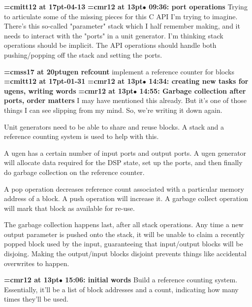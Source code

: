 {\medskip\noindent\bf\font\titlefont=cmitt12 at 17pt-04-13}\medskip
{\smallskip\noindent\bf\font\titlefont=cmr12 at 13pt\titlefont $\bullet$ 09:36: port operations}\smallskip
Trying to articulate some of the missing pieces for this C API I'm trying to imagine. There's this so-called "parameter" stack which I half remember making, and it needs to interact with the "ports" in a unit generator. I'm thinking stack operations should be implicit. The API operations should handle both pushing/popping off the stack and setting the ports.
\par

{\medskip\noindent\bf\font\titlefont=cmss17 at 20pt\titlefont ugen refcount}\medskip
implement a reference counter for blocks
{\medskip\noindent\bf\font\titlefont=cmitt12 at 17pt-01-31}\medskip
{\smallskip\noindent\bf\font\titlefont=cmr12 at 13pt\titlefont $\bullet$ 14:34: creating new tasks for ugens, writing words}\smallskip
{\smallskip\noindent\bf\font\titlefont=cmr12 at 13pt\titlefont $\bullet$ 14:55: Garbage collection after ports, order matters}\smallskip
I may have mentioned this already. But it's one of those things I can see slipping from my mind. So, we're writing it down again.
\par

Unit generators need to be able to share and reuse blocks. A stack and a reference counting system is used to help with this.
\par

A ugen has a certain number of input ports and output ports. A ugen generator will allocate data required for the DSP state, set up the ports, and then finally do garbage collection on the reference counter.
\par

A pop operation decreases reference count associated with a particular memory address of a block. A push operation will increase it. A garbage collect operation will mark that block as available for re-use.
\par

The garbage collection happens last, after all stack operations. Any time a new output parameter is pushed onto the stack, it will be unable to claim a recently popped block used by the input, guaranteeing that input/output blocks will be disjoing. Making the output/input blocks disjoint prevents things like accidental overwrites to happen.
\par

{\smallskip\noindent\bf\font\titlefont=cmr12 at 13pt\titlefont $\bullet$ 15:06: initial words}\smallskip
Build a reference counting system. Essentially, it'll be a list of block addresses and a count, indicating how many times they'll be used.
\par

